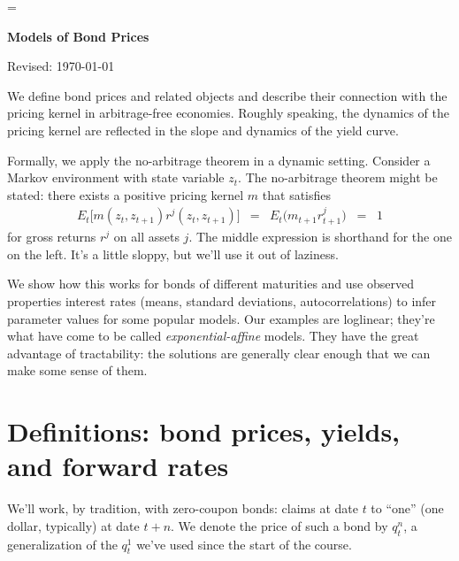 \documentclass[11pt]{article}
\begin{document}
\parskip=\bigskipamount
\parindent=0.0in
\thispagestyle{empty}


\bigskip\bigskip
\centerline{\Large \bf Models of Bond Prices}
\centerline{Revised: \today}

\begin{comment}
This is clunky...

Bodie Kane and Marcus as example?
\end{comment}

\bigskip
We define bond prices and related objects
and describe their connection with the pricing kernel in arbitrage-free economies.
Roughly speaking, the dynamics of the pricing kernel are reflected in the
slope and dynamics of the yield curve.

Formally, we apply the no-arbitrage theorem in a dynamic setting.
Consider a Markov environment with state variable $z_t$.
The no-arbitrage theorem might be stated:
there exists a positive pricing kernel $m$ that satisfies
\begin{eqnarray}
    E_t \big[ m(z_t, z_{t+1}) r^j(z_t, z_{t+1}) \big] &=&
    E_t \big( m_{t+1} r_{t+1}^j \big) \;\;=\;\; 1
    \label{eq:E(mr)=1}
\end{eqnarray}
for gross returns $r^j$ on all assets $j$.
The middle expression is shorthand for the one on the left.
It's a little sloppy, but we'll use it out of laziness.

We show how this works for bonds of different maturities
and use observed properties interest rates
(means, standard deviations, autocorrelations)
to infer parameter values for some popular models.
Our examples are loglinear; they're what have come to be
called {\it exponential-affine\/} models.
They have the great advantage of tractability:
the solutions are generally clear enough that we can make some
sense of them.


\section{Definitions:  bond prices, yields, and forward rates}


We'll work, by tradition, with zero-coupon bonds:
claims at date $t$ to ``one'' (one dollar, typically) at date $t+n$.
We denote the price of such a bond by $q^n_t$, a generalization
of the $q^1_t$ we've used since the start of the course.
\end{document}
